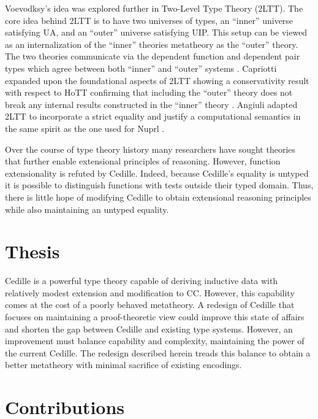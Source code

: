 Voevodksy's idea was explored further in Two-Level Type Theory (2LTT).
The core idea behind 2LTT is to have two universes of types, an ``inner'' universe satisfying UA, and an ``outer'' universe satisfying UIP.
This setup can be viewed as an internalization of the ``inner'' theories metatheory as the ``outer'' theory.
The two theories communicate via the dependent function and dependent pair types which agree between both ``inner'' and ``outer'' systems \cite{annenkov2017}.
Capriotti expanded upon the foundational aspects of 2LTT showing a conservativity result with respect to HoTT confirming that including the ``outer'' theory does not break any internal results constructed in the ``inner'' theory \cite{capriotti2017}.
Angiuli adapted 2LTT to incorporate a strict equality and justify a computational semantics in the same spirit as the one used for Nuprl \cite{angiuli2019}.

Over the course of type theory history many researchers have sought theories that further enable extensional principles of reasoning.
However, function extensionality is refuted by Cedille.
Indeed, because Cedille's equality is untyped it is possible to distinguish functions with tests outside their typed domain.
Thus, there is little hope of modifying Cedille to obtain extensional reasoning principles while also maintaining an untyped equality.

\section{Thesis}

Cedille is a powerful type theory capable of deriving inductive data with relatively modest extension and modification to CC.
However, this capability comes at the cost of a poorly behaved metatheory.
A redesign of Cedille that focuses on maintaining a proof-theoretic view could improve this state of affairs and shorten the gap between Cedille and existing type systems.
However, an improvement must balance capability and complexity, maintaining the power of the current Cedille.
The redesign described herein treads this balance to obtain a better metatheory with minimal sacrifice of existing encodings.

\section{Contributions}

